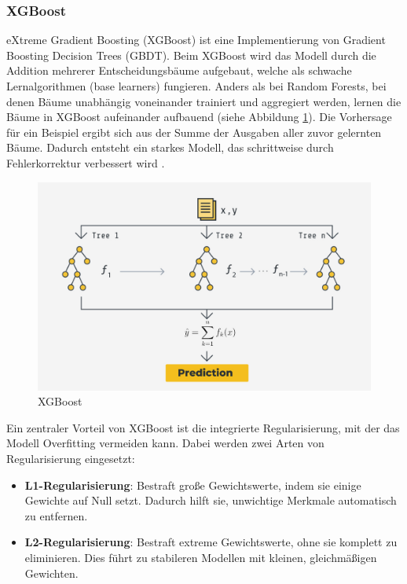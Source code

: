 \subsubsection{XGBoost}

eXtreme Gradient Boosting (XGBoost) ist eine Implementierung von Gradient Boosting Decision Trees (GBDT).
Beim XGBoost wird das Modell durch die Addition mehrerer Entscheidungsbäume aufgebaut, welche als
schwache Lernalgorithmen (base learners) fungieren. 
Anders als bei Random Forests, bei denen Bäume unabhängig voneinander trainiert und aggregiert werden, 
lernen die Bäume in XGBoost aufeinander aufbauend (siehe Abbildung \ref{fig:xgboost}). Die Vorhersage für ein Beispiel ergibt sich aus der Summe der 
Ausgaben aller zuvor gelernten Bäume. Dadurch entsteht ein starkes Modell, das schrittweise durch Fehlerkorrektur 
verbessert wird \cite{petrovic2024,chen2016xgboost,aslam2022}.

\begin{figure}[htbp]
    \begin{center}
        \includegraphics[scale=0.25]{static/xgboost-pipeline.jpg}
        \caption[XGBoost]{\label{fig:xgboost} XGBoost\footnotemark}
    \end{center}
\end{figure}

Ein zentraler Vorteil von XGBoost ist die integrierte Regularisierung, mit der das Modell Overfitting vermeiden kann. 
Dabei werden zwei Arten von Regularisierung eingesetzt:

\begin{itemize}
    \item \textbf{L1-Regularisierung}: Bestraft große Gewichtswerte, indem sie einige Gewichte auf Null setzt. 
        Dadurch hilft sie, unwichtige Merkmale automatisch zu entfernen.
    \item \textbf{L2-Regularisierung}: Bestraft extreme Gewichtswerte, ohne sie komplett zu eliminieren. 
        Dies führt zu stabileren Modellen mit kleinen, gleichmäßigen Gewichten.
\end{itemize}

